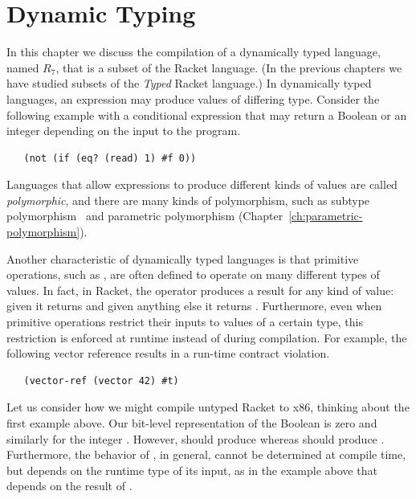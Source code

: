 \documentclass[11pt]{book}
\begin{document}
\chapter{Dynamic Typing}
\label{ch:type-dynamic}

In this chapter we discuss the compilation of a dynamically typed
language, named $R_7$, that is a subset of the Racket language. (In
the previous chapters we have studied subsets of the \emph{Typed}
Racket language.) In dynamically typed languages, an expression may
produce values of differing type. Consider the following example with
a conditional expression that may return a Boolean or an integer
depending on the input to the program.
\begin{lstlisting}
   (not (if (eq? (read) 1) #f 0))
\end{lstlisting}
Languages that allow expressions to produce different kinds of values
are called \emph{polymorphic}, and there are many kinds of
polymorphism, such as subtype polymorphism~\citep{Cardelli:1985kx} and
parametric polymorphism (Chapter~\ref{ch:parametric-polymorphism}).

Another characteristic of dynamically typed languages is that
primitive operations, such as , are often defined to operate
on many different types of values. In fact, in Racket, the 
operator produces a result for any kind of value: given  it
returns  and given anything else it returns .
Furthermore, even when primitive operations restrict their inputs to
values of a certain type, this restriction is enforced at runtime
instead of during compilation. For example, the following vector
reference results in a run-time contract violation.
\begin{lstlisting}
   (vector-ref (vector 42) #t)
\end{lstlisting}

Let us consider how we might compile untyped Racket to x86, thinking
about the first example above. Our bit-level representation of the
Boolean  is zero and similarly for the integer .
However,  should produce  whereas  should produce . Furthermore, the behavior of
, in general, cannot be determined at compile time, but
depends on the runtime type of its input, as in the example above that
depends on the result of .
\end{document}
